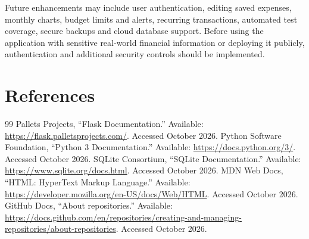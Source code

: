 \documentclass[11pt,a4paper]{report}
\begin{document}
Future enhancements may include user authentication, editing saved expenses, monthly charts, budget limits and alerts, recurring transactions, automated test coverage, secure backups and cloud database support. Before using the application with sensitive real-world financial information or deploying it publicly, authentication and additional security controls should be implemented.

\section*{References}
\begin{thebibliography}{99}
 Pallets Projects, ``Flask Documentation.'' Available: \url{https://flask.palletsprojects.com/}. Accessed October 2026.
 Python Software Foundation, ``Python 3 Documentation.'' Available: \url{https://docs.python.org/3/}. Accessed October 2026.
 SQLite Consortium, ``SQLite Documentation.'' Available: \url{https://www.sqlite.org/docs.html}. Accessed October 2026.
 MDN Web Docs, ``HTML: HyperText Markup Language.'' Available: \url{https://developer.mozilla.org/en-US/docs/Web/HTML}. Accessed October 2026.
 GitHub Docs, ``About repositories.'' Available: \url{https://docs.github.com/en/repositories/creating-and-managing-repositories/about-repositories}. Accessed October 2026.
\end{thebibliography}
\end{document}
